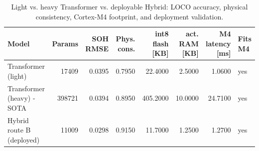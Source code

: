 \begin{table}
\caption{Light vs. heavy Transformer vs. deployable Hybrid: LOCO accuracy, physical consistency, Cortex-M4 footprint, and deployment validation.}
\label{tab:deployment_comparison}
\begin{tabular}{lrrrrrrl}
\toprule
Model & Params & SOH RMSE & Phys. cons. & int8 flash [KB] & act. RAM [KB] & M4 latency [ms] & Fits M4 \\
\midrule
Transformer (light) & 17409 & 0.0395 & 0.7950 & 22.4000 & 2.5000 & 1.0600 & yes \\
Transformer (heavy) - SOTA & 398721 & 0.0394 & 0.8950 & 405.2000 & 10.0000 & 24.7100 & yes \\
Hybrid route B (deployed) & 11009 & 0.0298 & 0.9150 & 11.7000 & 1.2500 & 1.2700 & yes \\
\bottomrule
\end{tabular}
\end{table}
